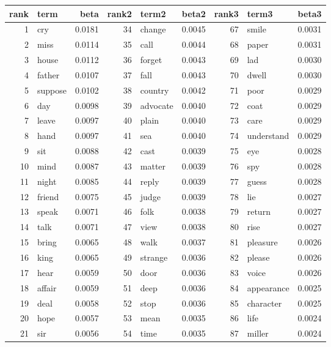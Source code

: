 \begin{table}[ht]
\centering
\begin{tabular}{rlrrlrrlr}
  \hline
rank & term & beta & rank2 & term2 & beta2 & rank3 & term3 & beta3 \\ 
  \hline
1 & cry & 0.0181 & 34 & change & 0.0045 & 67 & smile & 0.0031 \\ 
  2 & miss & 0.0114 & 35 & call & 0.0044 & 68 & paper & 0.0031 \\ 
  3 & house & 0.0112 & 36 & forget & 0.0043 & 69 & lad & 0.0030 \\ 
  4 & father & 0.0107 & 37 & fall & 0.0043 & 70 & dwell & 0.0030 \\ 
  5 & suppose & 0.0102 & 38 & country & 0.0042 & 71 & poor & 0.0029 \\ 
  6 & day & 0.0098 & 39 & advocate & 0.0040 & 72 & coat & 0.0029 \\ 
  7 & leave & 0.0097 & 40 & plain & 0.0040 & 73 & care & 0.0029 \\ 
  8 & hand & 0.0097 & 41 & sea & 0.0040 & 74 & understand & 0.0029 \\ 
  9 & sit & 0.0088 & 42 & cast & 0.0039 & 75 & eye & 0.0028 \\ 
  10 & mind & 0.0087 & 43 & matter & 0.0039 & 76 & spy & 0.0028 \\ 
  11 & night & 0.0085 & 44 & reply & 0.0039 & 77 & guess & 0.0028 \\ 
  12 & friend & 0.0075 & 45 & judge & 0.0039 & 78 & lie & 0.0027 \\ 
  13 & speak & 0.0071 & 46 & folk & 0.0038 & 79 & return & 0.0027 \\ 
  14 & talk & 0.0071 & 47 & view & 0.0038 & 80 & rise & 0.0027 \\ 
  15 & bring & 0.0065 & 48 & walk & 0.0037 & 81 & pleasure & 0.0026 \\ 
  16 & king & 0.0065 & 49 & strange & 0.0036 & 82 & please & 0.0026 \\ 
  17 & hear & 0.0059 & 50 & door & 0.0036 & 83 & voice & 0.0026 \\ 
  18 & affair & 0.0059 & 51 & deep & 0.0036 & 84 & appearance & 0.0025 \\ 
  19 & deal & 0.0058 & 52 & stop & 0.0036 & 85 & character & 0.0025 \\ 
  20 & hope & 0.0057 & 53 & mean & 0.0035 & 86 & life & 0.0024 \\ 
  21 & sir & 0.0056 & 54 & time & 0.0035 & 87 & miller & 0.0024 \\ 

\end{tabular}
\end{table}
